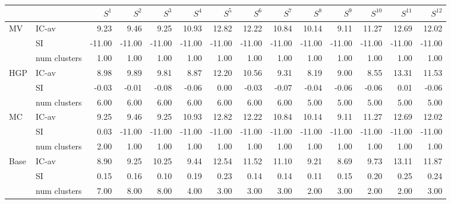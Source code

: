 \begin{tabular}{llrrrrrrrrrrrr}
\toprule
 &  & $S^{1}$ & $S^{2}$ & $S^{3}$ & $S^{4}$ & $S^{5}$ & $S^{6}$ & $S^{7}$ & $S^{8}$ & $S^{9}$ & $S^{10}$ & $S^{11}$ & $S^{12}$ \\
\midrule
\multirow[c]{3}{*}{MV} & IC-av & 9.23 & 9.46 & 9.25 & 10.93 & 12.82 & 12.22 & 10.84 & 10.14 & 9.11 & 11.27 & 12.69 & 12.02 \\
 & SI & -11.00 & -11.00 & -11.00 & -11.00 & -11.00 & -11.00 & -11.00 & -11.00 & -11.00 & -11.00 & -11.00 & -11.00 \\
 & num clusters & 1.00 & 1.00 & 1.00 & 1.00 & 1.00 & 1.00 & 1.00 & 1.00 & 1.00 & 1.00 & 1.00 & 1.00 \\
\multirow[c]{3}{*}{HGP} & IC-av & 8.98 & 9.89 & 9.81 & 8.87 & 12.20 & 10.56 & 9.31 & 8.19 & 9.00 & 8.55 & 13.31 & 11.53 \\
 & SI & -0.03 & -0.01 & -0.08 & -0.06 & 0.00 & -0.03 & -0.07 & -0.04 & -0.06 & -0.06 & 0.01 & -0.06 \\
 & num clusters & 6.00 & 6.00 & 6.00 & 6.00 & 6.00 & 6.00 & 6.00 & 5.00 & 5.00 & 5.00 & 5.00 & 5.00 \\
\multirow[c]{3}{*}{MC} & IC-av & 9.25 & 9.46 & 9.25 & 10.93 & 12.82 & 12.22 & 10.84 & 10.14 & 9.11 & 11.27 & 12.69 & 12.02 \\
 & SI & 0.03 & -11.00 & -11.00 & -11.00 & -11.00 & -11.00 & -11.00 & -11.00 & -11.00 & -11.00 & -11.00 & -11.00 \\
 & num clusters & 2.00 & 1.00 & 1.00 & 1.00 & 1.00 & 1.00 & 1.00 & 1.00 & 1.00 & 1.00 & 1.00 & 1.00 \\
\multirow[c]{3}{*}{Base} & IC-av & 8.90 & 9.25 & 10.25 & 9.44 & 12.54 & 11.52 & 11.10 & 9.21 & 8.69 & 9.73 & 13.11 & 11.87 \\
 & SI & 0.15 & 0.16 & 0.10 & 0.19 & 0.23 & 0.14 & 0.14 & 0.11 & 0.15 & 0.20 & 0.25 & 0.24 \\
 & num clusters & 7.00 & 8.00 & 8.00 & 4.00 & 3.00 & 3.00 & 3.00 & 2.00 & 3.00 & 2.00 & 2.00 & 3.00 \\
\bottomrule
\end{tabular}
